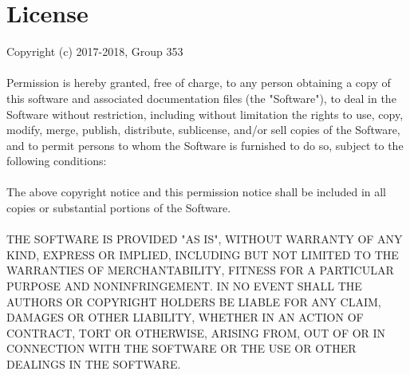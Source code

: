 \documentclass[ManualeSviluppatore]{subfiles}
\begin{document}
\chapter{License}

\begin{ttfamily}
Copyright (c) 2017-2018, Group 353
\\ \\
Permission is hereby granted, free of charge, to any person obtaining a copy
of this software and associated documentation files (the "Software"), to deal
in the Software without restriction, including without limitation the rights
to use, copy, modify, merge, publish, distribute, sublicense, and/or sell
copies of the Software, and to permit persons to whom the Software is
furnished to do so, subject to the following conditions:
\\ \\
The above copyright notice and this permission notice shall be included in all
copies or substantial portions of the Software.
\\ \\
THE SOFTWARE IS PROVIDED "AS IS", WITHOUT WARRANTY OF ANY KIND, EXPRESS OR
IMPLIED, INCLUDING BUT NOT LIMITED TO THE WARRANTIES OF MERCHANTABILITY,
FITNESS FOR A PARTICULAR PURPOSE AND NONINFRINGEMENT. IN NO EVENT SHALL THE
AUTHORS OR COPYRIGHT HOLDERS BE LIABLE FOR ANY CLAIM, DAMAGES OR OTHER
LIABILITY, WHETHER IN AN ACTION OF CONTRACT, TORT OR OTHERWISE, ARISING FROM,
OUT OF OR IN CONNECTION WITH THE SOFTWARE OR THE USE OR OTHER DEALINGS IN THE
SOFTWARE.
\end{ttfamily}
\end{document}
